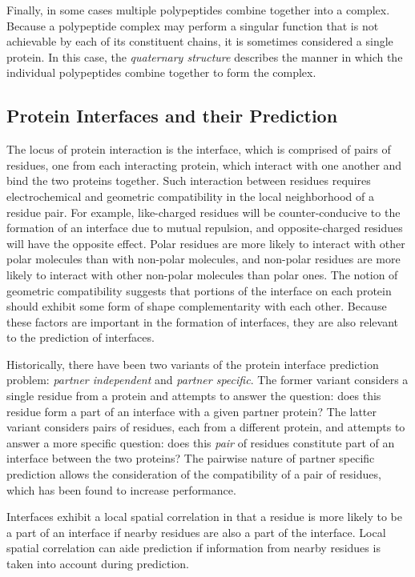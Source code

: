Finally, in some cases multiple polypeptides combine together into a complex.
Because a polypeptide complex may perform a singular function that is not achievable by each of its constituent chains, it is sometimes considered a single protein.
In this case, the \textit{quaternary structure} describes the manner in which the individual polypeptides combine together to form the complex. 


\subsection{Protein Interfaces and their Prediction}

The locus of protein interaction is the interface, which is comprised of pairs of residues, one from each interacting protein, which interact with one another and bind the two proteins together.
Such interaction between residues requires electrochemical and geometric compatibility in the local neighborhood of a residue pair.
For example, like-charged residues will be counter-conducive to the formation of an interface due to mutual repulsion, and opposite-charged residues will have the opposite effect.
Polar residues are more likely to interact with other polar molecules than with non-polar molecules, and non-polar residues are more likely to interact with other non-polar molecules than polar ones.
The notion of geometric compatibility suggests that portions of the interface on each protein should exhibit some form of shape complementarity with each other. 
Because these factors are important in the formation of interfaces, they are also relevant to the prediction of interfaces.

Historically, there have been two variants of the protein interface prediction problem: \textit{partner independent} and \textit{partner specific}.
The former variant considers a single residue from a protein and attempts to answer the question: does this residue form a part of an interface with a given partner protein?
The latter variant considers pairs of residues, each from a different protein, and attempts to answer a more specific question: does this \textit{pair} of residues constitute part of an interface between the two proteins?
The pairwise nature of partner specific prediction allows the consideration of the compatibility of a pair of residues, which has been found to increase performance\cite{ahmad2011}.

Interfaces exhibit a local spatial correlation in that a residue is more likely to be a part of an interface if nearby residues are also a part of the interface. 
Local spatial correlation can aide prediction if information from nearby residues is taken into account during prediction.

